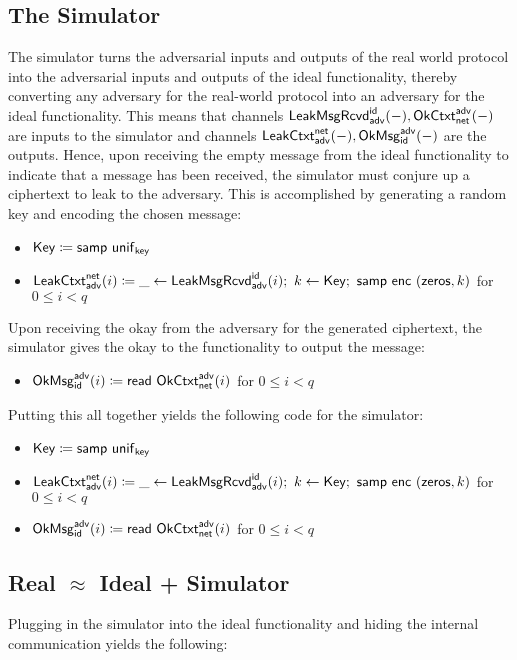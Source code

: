 \subsection{The Simulator}
The simulator turns the adversarial inputs and outputs of the real world protocol into the adversarial inputs and outputs of the ideal functionality, thereby converting any adversary for the real-world protocol into an adversary for the ideal functionality. This means that channels $\mathsf{LeakMsgRcvd}^{\mathsf{id}}_{\mathsf{adv}}(-), \mathsf{OkCtxt}^{\mathsf{adv}}_{\mathsf{net}}(-)$ are inputs to the simulator and channels $\mathsf{LeakCtxt}^{\mathsf{net}}_{\mathsf{adv}}(-), \mathsf{OkMsg}^{\mathsf{adv}}_{\mathsf{id}}(-)$ are the outputs. Hence, upon receiving the empty message from the ideal functionality to indicate that a message has been received, the simulator must conjure up a ciphertext to leak to the adversary. This is accomplished by generating a random key and encoding the chosen message:
\begin{itemize}
\item $\mathsf{Key} \coloneqq \mathsf{samp} \ \mathsf{unif}_{\mathsf{key}}$
\item $\LeakCtxt^\net_\adv(i) \coloneqq \_ \leftarrow \LeakMsgRcvd^\id_\adv(i); \ k \leftarrow \Key; \ \samp{\enc \ (\zeros,k)}$ for $0 \leq i < q$
\end{itemize}
Upon receiving the okay from the adversary for the generated ciphertext, the simulator gives the okay to the functionality to output the message:
\begin{itemize}
\item $\mathsf{OkMsg}^{\mathsf{adv}}_{\mathsf{id}}(i) \coloneqq \mathsf{read} \ \mathsf{OkCtxt}^{\mathsf{adv}}_{\mathsf{net}}(i)$ for $0 \leq i < q$
\end{itemize}
Putting this all together yields the following code for the simulator:
\begin{itemize}
\item $\mathsf{Key} \coloneqq \mathsf{samp} \ \mathsf{unif}_{\mathsf{key}}$
\item $\LeakCtxt^\net_\adv(i) \coloneqq \_ \leftarrow \LeakMsgRcvd^\id_\adv(i); \ k \leftarrow \Key; \ \samp{\enc \ (\zeros,k)}$ for $0 \leq i < q$
\item $\mathsf{OkMsg}^{\mathsf{adv}}_{\mathsf{id}}(i) \coloneqq \mathsf{read} \ \mathsf{OkCtxt}^{\mathsf{adv}}_{\mathsf{net}}(i)$ for $0 \leq i < q$
\end{itemize}

\subsection{Real $\approx$ Ideal + Simulator}
Plugging in the simulator into the ideal functionality and hiding the internal communication yields the following:

